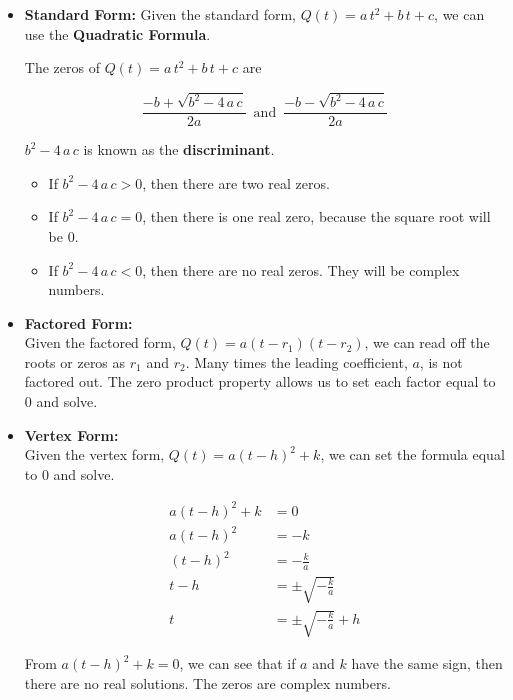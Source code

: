 \documentclass{ximera}
\begin{document}
\begin{itemize}

\item \textbf{\textcolor{purple!85!blue}{Standard Form:}}  Given the standard form, $Q(t) = a \, t^2 + b \, t + c$, we can use the \textbf{Quadratic Formula}.

The zeros of $Q(t) = a \, t^2 + b \, t + c$ are

\[   \frac{-b + \sqrt{b^2 - 4 \, a \, c}}{2a}      \, \text{ and } \,       \frac{-b - \sqrt{b^2 - 4 \, a \, c}}{2a}    \]



$b^2 - 4 \, a \, c$ is known as the \textbf{discriminant}. 




\begin{itemize}
\item If $b^2 - 4 \, a \, c > 0$, then there are two real zeros.
\item If $b^2 - 4 \, a \, c = 0$, then there is one real zero, because the square root will be $0$.
\item If $b^2 - 4 \, a \, c < 0$, then there are no real zeros.  They will be complex numbers.
\end{itemize}





\item \textbf{\textcolor{purple!85!blue}{Factored Form:}} \\ 
Given the factored form, $Q(t) = a (t - r_1)(t - r_2)$, we can read off the roots or zeros as $r_1$ and $r_2$. Many times the leading coefficient, $a$, is not factored out.  The zero product property allows us to set each factor equal to $0$ and solve.






\item  \textbf{\textcolor{purple!85!blue}{Vertex Form:}} \\
Given the vertex form, $Q(t) = a (t - h)^2 + k$, we can set the formula equal to $0$ and solve.



\begin{align*}
a (t - h)^2 + k    & = 0  \\
a (t - h)^2        & = -k  \\
(t - h)^2        & = -\frac{k}{a}  \\
t - h        & = \pm \sqrt{-\frac{k}{a}}  \\
t        & = \pm \sqrt{-\frac{k}{a}}  + h
\end{align*}

From $a (t - h)^2 + k  = 0$, we can see that if $a$ and $k$ have the same sign, then there are no real solutions.  The zeros are complex numbers.



\end{itemize}
\end{document}

